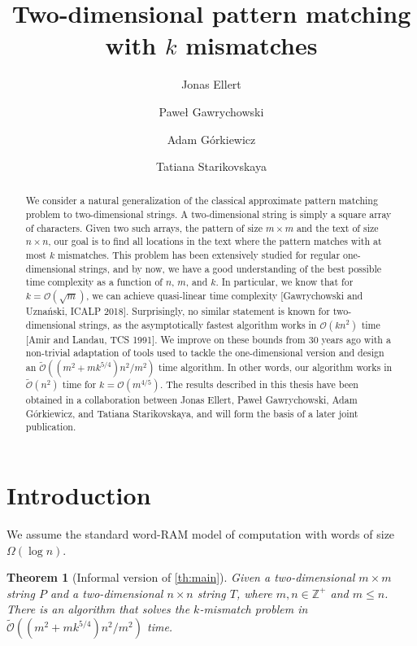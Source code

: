 \documentclass[11pt, letterpaper]{article}
\title{Two-dimensional pattern matching with $k$ mismatches}
\author[1]{Jonas Ellert}
\author[2]{Paweł Gawrychowski}
\author[3]{Adam Górkiewicz}
\author[4]{Tatiana Starikovskaya}
\affil[1]{DI/ENS, PSL Research University, France}
\affil[2,3]{Institute of Computer Science, University of Wrocław, Poland}
\affil[4]{DI/ENS, PSL Research University, France}
\theoremstyle{plain}
\newtheorem{theorem}{Theorem}
\theoremstyle{definition}
\theoremstyle{remark}
\newcommand{\Z}{\mathbb{Z}}
\renewcommand{\O}{\mathcal{O}}
\newcommand{\tO}{\tilde{\mathcal{O}}}
\begin{document}
\date{}
\maketitle

\begin{abstract}
	We consider a natural generalization of the classical approximate pattern matching problem to two-dimensional strings.
	A two-dimensional string is simply a square array of characters.
	Given two such arrays, the pattern of size $m\times m$ and the text of size $n\times n$, our goal is to find all locations in the text where the pattern matches with at most $k$ mismatches.
	This problem has been extensively studied for regular one-dimensional strings, and by now, we have a good understanding of the best possible time complexity as a function of $n$, $m$, and $k$.
	In particular, we know that for $k=\O(\sqrt{m})$, we can achieve quasi-linear time complexity [Gawrychowski and Uznański, ICALP 2018].
	Surprisingly, no similar statement is known for two-dimensional strings, as the asymptotically fastest algorithm works in $\O(kn^{2})$ time [Amir and Landau, TCS 1991].
	We improve on these bounds from 30 years ago with a non-trivial adaptation of tools used to tackle the one-dimensional version and design an $\tO((m^{2}+mk^{5/4})n^{2}/m^{2})$ time algorithm.
	In other words, our algorithm works in $\tO(n^{2})$ time for $k=\O(m^{4/5})$.
	The results described in this thesis have been obtained in a collaboration between Jonas Ellert, Paweł Gawrychowski, Adam Górkiewicz, and Tatiana Starikovskaya, and will form the basis of a later joint publication.
\end{abstract}

\section{Introduction}

We assume the standard word-RAM model of computation with words of size $\Omega(\log n)$.


\begin{theorem}[Informal version of \cref{th:main}]
Given a two-dimensional $m \times m$ string $P$ and a two-dimensional $n \times n$ string $T$, where $m,n \in \Z^+$ and $m \le n$. There is an algorithm that solves the $k$-mismatch problem in $\tO((m^2 + mk^{5/4})n^2 / m^2)$ time.
\end{theorem}

\end{document}
